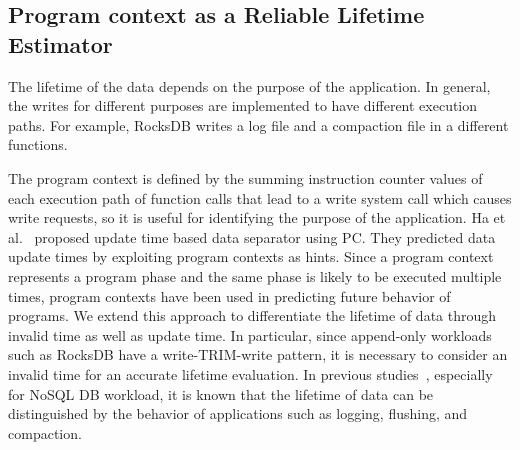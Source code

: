 
\subsection{Program context as a Reliable Lifetime Estimator}
The lifetime of the data depends on the purpose of the application. 
In general, the writes for different purposes are implemented to have different execution paths.
For example, RocksDB writes a log file and a compaction file in a different functions.

The program context is defined by the summing instruction counter values 
of each execution path of function calls that lead to a write system call which causes write requests,
so it is useful for identifying the purpose of the application. 
Ha et al.~\cite{PCHa} proposed update time based data separator using PC. 
They predicted data update times by exploiting program contexts as hints. 
Since a program context represents a program phase and the same phase is likely to be executed multiple times, 
program contexts have been used in predicting future behavior of programs. 
We extend this approach to differentiate the lifetime of data through invalid time as well as update time. 
In particular, since append-only workloads such as RocksDB have a write-TRIM-write pattern, 
it is necessary to consider an invalid time for an accurate lifetime evaluation.
In previous studies~\cite{MultiStream}, especially for NoSQL DB workload, 
it is known that the lifetime of data can be distinguished by the behavior of applications such as logging, 
flushing, and compaction. 

